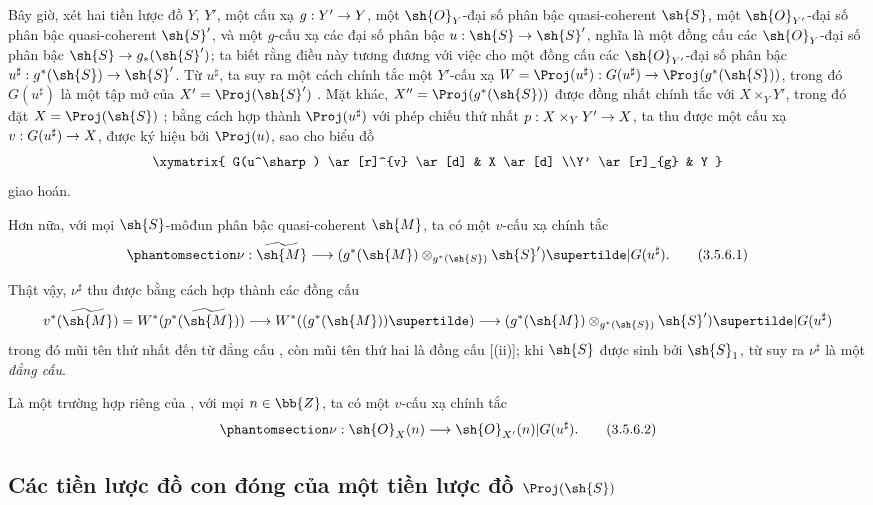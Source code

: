 \documentclass[oneside,10pt]{amsart}
\makeatletter
\newcommand{\ega@arrow}[2]{\mathchoice{#1}{#2}{#2}{#2}}
\renewcommand{\to}{\ega@arrow{\longrightarrow}{\rightarrow}}
\newcommand{\oldpage}[2][]{\marginnote{\normalfont\footnotesize\textbf{#1}~|~#2}\ignorespaces}
\let\EGAOriginalLabel\label
\renewcommand{\label}[1]{\phantomsection\EGAOriginalLabel{#1}}
\makeatother
\begin{document}
\begin{env}[3.5.6]
\label{II.3.5.6}
Bây giờ, xét hai tiền lược đồ $Y$, $Y'$, một cấu xạ $g:Y'\to Y$, một $\sh{O}_Y$-đại số phân bậc quasi-coherent $\sh{S}$, một $\sh{O}_{Y'}$-đại số phân bậc quasi-coherent $\sh{S}'$, và một $g$-cấu xạ các đại số phân bậc $u:\sh{S}\to\sh{S}'$, nghĩa là một đồng cấu các $\sh{O}_Y$-đại số phân bậc $\sh{S}\to g_*(\sh{S}')$;
ta biết rằng điều này tương đương với việc cho một đồng cấu các $\sh{O}_{Y'}$-đại số phân bậc $u^\sharp:g^*(\sh{S})\to\sh{S}'$.
Từ $u^\sharp$, ta suy ra một cách chính tắc một $Y'$-cấu xạ $W=\Proj(u^\sharp):G(u^\sharp)\to\Proj(g^*(\sh{S}))$, trong đó $G(u^\sharp)$ là một tập mở của $X'=\Proj(\sh{S}')$ .
Mặt khác, $X''=\Proj(g^*(\sh{S}))$ được đồng nhất
\oldpage[II]{64}
chính tắc với $X\times_Y Y'$, trong đó đặt $X=\Proj(\sh{S})$ ;
bằng cách hợp thành $\Proj(u^\sharp)$ với phép chiếu thứ nhất $p:X\times_Y Y'\to X$, ta thu được một cấu xạ $v:G(u^\sharp)\to X$, được ký hiệu bởi $\Proj(u)$, sao cho biểu đồ
\[
  \xymatrix{
    G(u^\sharp) \ar[r]^{v} \ar[d]
    & X \ar[d]
  \\Y' \ar[r]_{g}
    & Y
  }
\]
giao hoán.

Hơn nữa, với mọi $\sh{S}$-môđun phân bậc quasi-coherent $\sh{M}$, ta có một $v$-cấu xạ chính tắc
\[
\label{II.3.5.6.1}
  \nu:\widetilde{\sh{M}}\to(g^*(\sh{M})\otimes_{g^*(\sh{S})}\sh{S}')\supertilde|G(u^\sharp).
\tag{3.5.6.1}
\]

Thật vậy, $\nu^\sharp$ thu được bằng cách hợp thành các đồng cấu
\[
  v^*(\widetilde{\sh{M}})
  =W^*(p^*(\widetilde{\sh{M}}))
  \to W^*((g^*(\sh{M}))\supertilde)
  \to (g^*(\sh{M})\otimes_{g^*(\sh{S})}\sh{S}')\supertilde|G(u^\sharp)
\]
trong đó mũi tên thứ nhất đến từ đẳng cấu , còn mũi tên thứ hai là đồng cấu [(ii)];
khi $\sh{S}$ được sinh bởi $\sh{S}_1$, từ  suy ra $\nu^\sharp$ là một \emph{đẳng cấu}.

Là một trường hợp riêng của , với mọi $n\in\bb{Z}$, ta có một $v$-cấu xạ chính tắc
\[
\label{II.3.5.6.2}
  \nu:\sh{O}_X(n)\to\sh{O}_{X'}(n)|G(u^\sharp).
\tag{3.5.6.2}
\]
\end{env}

\subsection{Các tiền lược đồ con đóng của một tiền lược đồ $\Proj(\sh{S})$}
\label{subsection:II.3.6}
\end{document}
